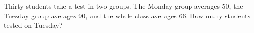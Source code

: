 Thirty students take a test in two groups. The Monday group averages $50$, the Tuesday group averages $90$, and the whole class averages $66$. How many students tested on Tuesday?
